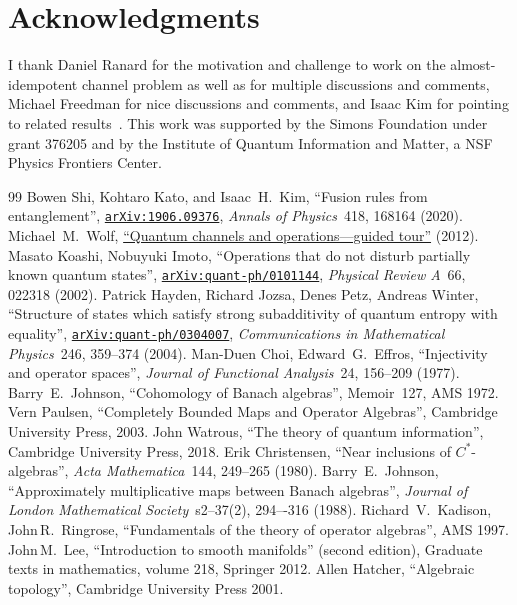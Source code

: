 \documentclass[12pt]{article}
\newcommand{\arXiv}[1]{\href{http://arxiv.org/abs/#1}{\texttt{arXiv:#1}}}
\newtheorem[definition]{Definition}[Theorem]{Definition}
\newtheorem[remark]{Example}[Theorem]{Example}
\newtheorem[remark]{Remark}[Theorem]{Remark}
\newtheorem[remark]{Question}[Theorem]{Open question}
\newtheorem*[definition]{definition}{Definition}
\newtheorem*[remark]{example}{Example}
\newtheorem*[remark]{remark}{Remark}
\newtheorem*[remark]{question}{Open question}
\numberwithin{equation}{section}
\begin{document}
\section*{Acknowledgments}

I thank Daniel Ranard for the motivation and challenge to work on the almost-idempotent channel problem as well as for multiple discussions and comments, Michael Freedman for nice discussions and comments, and Isaac Kim for pointing to related results~\cite{KoIm01,HJPW03}. This work was supported by the Simons Foundation under grant 376205 and by the Institute of Quantum Information and Matter, a NSF Physics Frontiers Center.


\begin{thebibliography}{99}
 Bowen Shi, Kohtaro Kato, and Isaac~H.\ Kim, ``Fusion rules from entanglement'', \arXiv{1906.09376}, \textit{Annals of Physics}\ 418, 168164 (2020).
 Michael~M.\ Wolf, \href{https://mediatum.ub.tum.de/doc/1701036/document.pdf}{``Quantum channels and operations---guided tour''} (2012).
 Masato Koashi, Nobuyuki Imoto, ``Operations that do not disturb partially known quantum states'', \arXiv{quant-ph/0101144}, \textit{Physical Review A}\ 66, 022318 (2002).
 Patrick Hayden, Richard Jozsa, Denes Petz, Andreas Winter, ``Structure of states which satisfy strong subadditivity of quantum entropy with equality'', \arXiv{quant-ph/0304007}, \textit{Communications in Mathematical Physics}\ 246, 359--374 (2004).
 Man-Duen Choi, Edward~G.\ Effros, ``Injectivity and operator spaces'', \textit{Journal of Functional Analysis}\ 24, 156--209 (1977).
 Barry~E.\ Johnson, ``Cohomology of Banach algebras'', Memoir~127, AMS 1972.
 Vern Paulsen, ``Completely Bounded Maps and Operator Algebras'', Cambridge University Press, 2003.
 John Watrous, ``The theory of quantum information'', Cambridge University Press, 2018.
 Erik Christensen, ``Near inclusions of $C^*$-algebras'', \textit{Acta Mathematica}\ 144, 249--265 (1980).
 Barry~E.\ Johnson, ``Approximately multiplicative maps between Banach algebras'', \textit{Journal of London Mathematical Society}\ s2--37(2), 294–-316 (1988).
 Richard~V.\ Kadison, John\,R.\ Ringrose, ``Fundamentals of the theory of operator algebras'', AMS 1997.
 John\,M.~Lee, ``Introduction to smooth manifolds'' (second edition), Graduate texts in mathematics, volume 218, Springer 2012.
 Allen Hatcher, ``Algebraic topology'', Cambridge University Press 2001.

\end{thebibliography}
\end{document}
